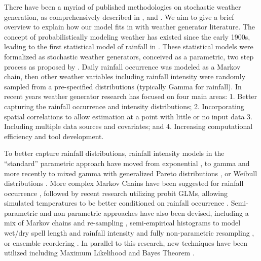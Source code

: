 \documentclass[11pt]{article}
\begin{document}
There have been a myriad of published methodologies on stochastic weather generation, as comprehensively described in \cite{Wilks1999}, \cite{Sanso2000} and \cite{Verdin2015}.   We aim to give a brief overview to explain how our model fits in with weather generator literature.  The concept of probabilistically modeling weather has existed since the early 1900s, leading to the first statistical model of rainfall in \cite{Gabriel1962}.  These statistical models were formalized as stochastic weather generators, conceived as a parametric, two step process as proposed by \cite{Richardson1981}.  Daily rainfall occurrence was modeled as a Markov chain, then other weather variables including rainfall intensity were randomly sampled from a pre-specified distributions (typically Gamma for rainfall).   In recent years weather generator research has focused on four main areas: 1. Better capturing the rainfall occurrence and intensity distributions; 2. Incorporating spatial correlations to allow estimation at a point with little or no input data 3. Including multiple data sources and covariates; and 4. Increasing computational efficiency and tool development.  

To better capture rainfall distributions, rainfall intensity models in the ``standard'' parametric approach have moved from exponential \cite{Richardson1981}, to gamma \cite{Thom1958, Katz1977, Buishand1978, Coe1984, Wilks1992} and more recently to mixed gamma with generalized Pareto distributions \cite{Lennartsson2008}, or Weibull distributions \cite{Wilks1989, Furrer2008}.  More complex  Markov Chains have been suggested for rainfall occurrence \cite{Jones1993, Dastidar2010}, followed by recent research utilizing probit GLMs, allowing simulated temperatures to be better conditioned on rainfall occurrence \cite{Verdin2015}. Semi-parametric and non parametric approaches have also been devised, including a mix of Markov chains and re-sampling \cite{Apipattanavis2007}, semi-empirical histograms to model wet/dry spell length and rainfall intensity \cite{Racsko1991, Semenov2008} and fully non-parametric resampling \cite{Young1994,Lall1996, Rajagopalan1999}, or ensemble reordering \cite{Ghile2009}. In parallel to this research, new techniques have been utilized including Maximum Likelihood \cite{Fasso2011} and Bayes Theorem \cite{Sanso2000}.
\end{document}
